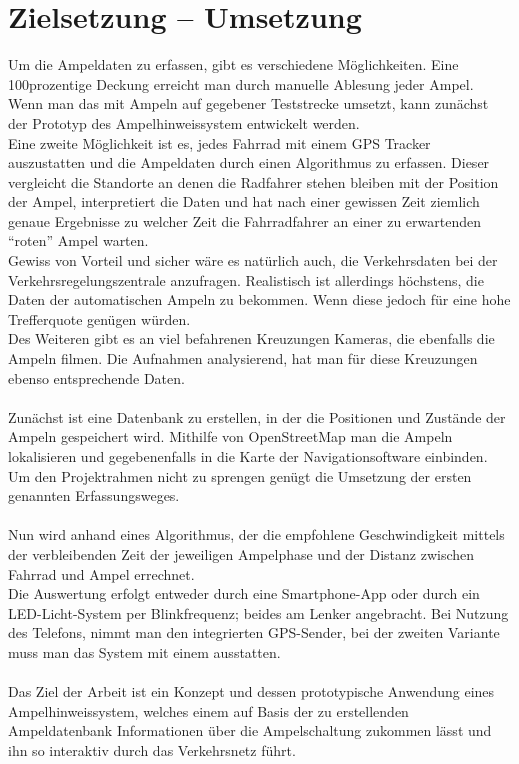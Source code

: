 \section{Zielsetzung -- Umsetzung}
Um die Ampeldaten zu erfassen, gibt es verschiedene Möglichkeiten. Eine 100prozentige Deckung erreicht man durch manuelle Ablesung jeder Ampel. Wenn man das mit Ampeln auf gegebener Teststrecke umsetzt, kann zunächst der Prototyp des Ampelhinweissystem entwickelt werden. \\
Eine zweite Möglichkeit ist es, jedes Fahrrad mit einem GPS Tracker auszustatten und die Ampeldaten durch einen Algorithmus zu erfassen. Dieser vergleicht die Standorte an denen die Radfahrer stehen bleiben mit der Position der Ampel, interpretiert die Daten und hat nach einer gewissen Zeit ziemlich genaue Ergebnisse zu welcher Zeit die Fahrradfahrer an einer zu erwartenden “roten” Ampel warten.\\
Gewiss von Vorteil und sicher wäre es natürlich auch, die Verkehrsdaten bei der Verkehrsregelungszentrale anzufragen. Realistisch ist allerdings höchstens, die Daten der automatischen Ampeln zu bekommen. Wenn diese jedoch für eine hohe Trefferquote genügen würden.\\
Des Weiteren gibt es an viel befahrenen Kreuzungen Kameras, die ebenfalls die Ampeln filmen. Die Aufnahmen analysierend, hat man für diese Kreuzungen ebenso entsprechende Daten.\\\\
Zunächst ist eine Datenbank zu erstellen, in der die Positionen und Zustände der Ampeln gespeichert wird. Mithilfe von OpenStreetMap man die Ampeln lokalisieren und gegebenenfalls in die Karte der Navigationsoftware einbinden. Um den Projektrahmen nicht zu sprengen genügt die Umsetzung der ersten genannten Erfassungsweges.\\\\
Nun wird anhand eines Algorithmus, der die empfohlene Geschwindigkeit mittels der verbleibenden Zeit der jeweiligen Ampelphase und der Distanz zwischen Fahrrad und Ampel errechnet.\\
Die Auswertung erfolgt entweder durch eine Smartphone-App oder durch ein \gls{LED}-Licht-System per Blinkfrequenz; beides am Lenker angebracht. Bei Nutzung des Telefons, nimmt man den integrierten GPS-Sender, bei der zweiten Variante muss man das System mit einem ausstatten.
\\\\
Das Ziel der Arbeit ist ein Konzept und dessen prototypische Anwendung eines Ampelhinweissystem, welches einem auf Basis der zu erstellenden  Ampeldatenbank Informationen über die Ampelschaltung zukommen lässt und ihn so interaktiv durch das Verkehrsnetz führt.

